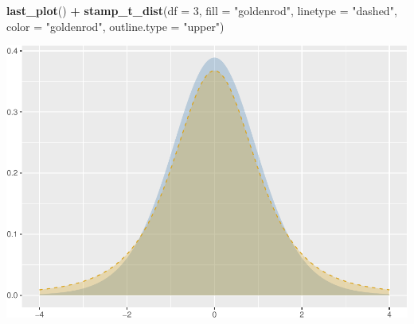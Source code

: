 \documentclass[12pt]{article}
\newenvironment{Shaded}{\begin{snugshade}}{\end{snugshade}}
\newcommand{\DataTypeTok}[1]{\textcolor[rgb]{0.13,0.29,0.53}{#1}}
\newcommand{\DecValTok}[1]{\textcolor[rgb]{0.00,0.00,0.81}{#1}}
\newcommand{\KeywordTok}[1]{\textcolor[rgb]{0.13,0.29,0.53}{\textbf{#1}}}
\newcommand{\NormalTok}[1]{#1}
\newcommand{\OperatorTok}[1]{\textcolor[rgb]{0.81,0.36,0.00}{\textbf{#1}}}
\newcommand{\StringTok}[1]{\textcolor[rgb]{0.31,0.60,0.02}{#1}}
\begin{document}
\begin{Shaded}
\begin{Highlighting}[]
\KeywordTok{last_plot}\NormalTok{() }\OperatorTok{+}
\StringTok{  }\KeywordTok{stamp_t_dist}\NormalTok{(}\DataTypeTok{df =} \DecValTok{3}\NormalTok{, }
               \DataTypeTok{fill =} \StringTok{"goldenrod"}\NormalTok{,}
               \DataTypeTok{linetype =} \StringTok{"dashed"}\NormalTok{,}
               \DataTypeTok{color =} \StringTok{"goldenrod"}\NormalTok{,}
               \DataTypeTok{outline.type =} \StringTok{"upper"}\NormalTok{)}
\end{Highlighting}
\end{Shaded}

\begin{center}\includegraphics[width=0.5\linewidth]{manuscript_files/figure-latex/unnamed-chunk-11-2} \end{center}
\end{document}
